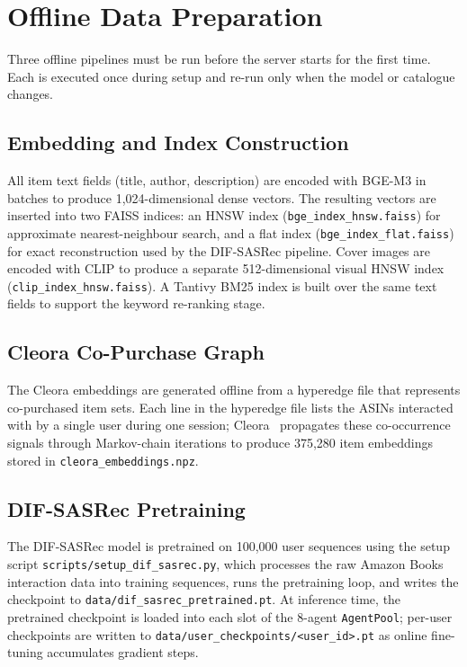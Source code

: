 \section{Offline Data Preparation}
\label{sec:app_preparation}

Three offline pipelines must be run before the server starts for the first time.
Each is executed once during setup and re-run only when the model or catalogue changes.

\subsection{Embedding and Index Construction}

All item text fields (title, author, description) are encoded with BGE-M3 in batches to produce 1{,}024-dimensional dense vectors.
The resulting vectors are inserted into two FAISS indices: an HNSW index (\nolinkurl{bge_index_hnsw.faiss}) for approximate nearest-neighbour search, and a flat index (\nolinkurl{bge_index_flat.faiss}) for exact reconstruction used by the DIF-SASRec pipeline.
Cover images are encoded with CLIP to produce a separate 512-dimensional visual HNSW index (\nolinkurl{clip_index_hnsw.faiss}).
A Tantivy BM25 index is built over the same text fields to support the keyword re-ranking stage.

\subsection{Cleora Co-Purchase Graph}

The Cleora embeddings are generated offline from a hyperedge file that represents co-purchased item sets.
Each line in the hyperedge file lists the ASINs interacted with by a single user during one session; Cleora~\cite{rychalska2021cleora} propagates these co-occurrence signals through Markov-chain iterations to produce 375{,}280 item embeddings stored in \nolinkurl{cleora_embeddings.npz}.

\subsection{DIF-SASRec Pretraining}

The DIF-SASRec model is pretrained on 100{,}000 user sequences using the setup script \nolinkurl{scripts/setup_dif_sasrec.py}, which processes the raw Amazon Books interaction data into training sequences, runs the pretraining loop, and writes the checkpoint to \nolinkurl{data/dif_sasrec_pretrained.pt}.
At inference time, the pretrained checkpoint is loaded into each slot of the 8-agent \texttt{AgentPool}; per-user checkpoints are written to \nolinkurl{data/user_checkpoints/<user_id>.pt} as online fine-tuning accumulates gradient steps.
